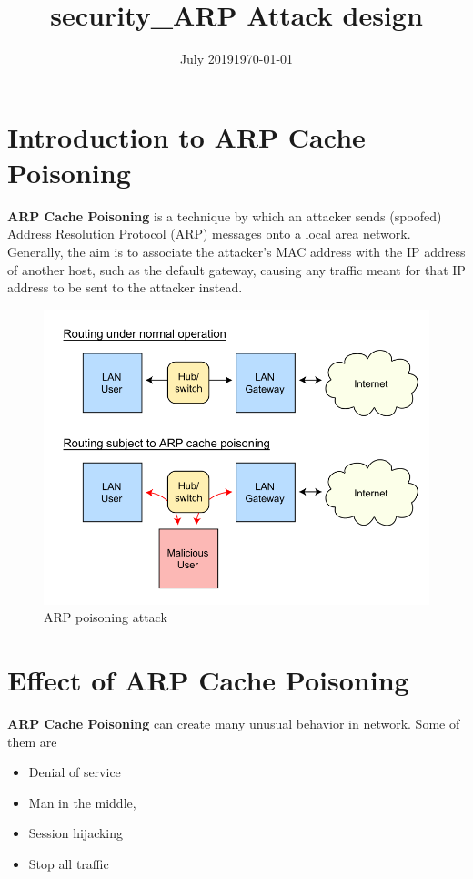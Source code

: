 \documentclass{article}
\title{security_ARP Attack design}
\date{July 2019}
\date{\today}
\begin{document}
\tableofcontents
\newpage

\section{Introduction to ARP Cache Poisoning}
\textbf{ARP Cache Poisoning} is a technique by which an attacker sends (spoofed) Address Resolution Protocol (ARP) messages onto a local area network. Generally, the aim is to associate the attacker's MAC address with the IP address of another host, such as the default gateway, causing any traffic meant for that IP address to be sent to the attacker instead.

\begin{figure}[h]
    \centering
\includegraphics[width=\textwidth]{images/arp.jpg}
\captioig  ARP poisoning attack
\end{figure}

\section{Effect of ARP Cache Poisoning}
\textbf{ARP Cache Poisoning} can create many unusual behavior in  network. Some of them are 
\renewcommand\labelitemi{$\square$}
\begin{itemize}
    \item  Denial of service
    \item  Man in the middle,
    \item  Session hijacking
    \item Stop all traffic
    
\end{itemize}
\end{document}
